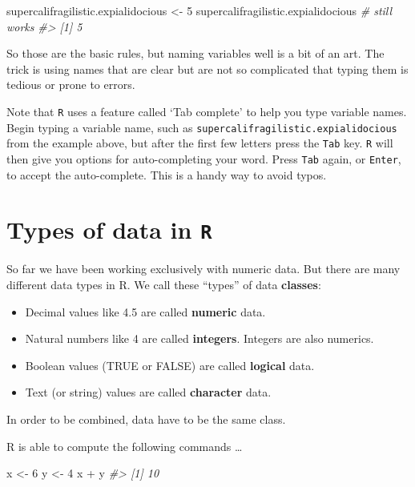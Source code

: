 \documentclass[
]{book}
\newenvironment{Shaded}{\begin{snugshade}}{\end{snugshade}}
\newcommand{\CommentTok}[1]{\textcolor[rgb]{0.56,0.35,0.01}{\textit{#1}}}
\newcommand{\DecValTok}[1]{\textcolor[rgb]{0.00,0.00,0.81}{#1}}
\newcommand{\NormalTok}[1]{#1}
\newcommand{\OtherTok}[1]{\textcolor[rgb]{0.56,0.35,0.01}{#1}}
\newcommand{\SpecialCharTok}[1]{\textcolor[rgb]{0.00,0.00,0.00}{#1}}
\providecommand{\tightlist}{%
  \setlength{\itemsep}{0pt}\setlength{\parskip}{0pt}}
\begin{document}
\begin{Shaded}
\begin{Highlighting}[]
\NormalTok{supercalifragilistic.expialidocious }\OtherTok{\textless{}{-}} \DecValTok{5}
\NormalTok{supercalifragilistic.expialidocious  }\CommentTok{\# still works}
\CommentTok{\#\textgreater{} [1] 5}
\end{Highlighting}
\end{Shaded}

So those are the basic rules, but naming variables well is a bit of an art. The trick is using names that are clear but are not so complicated that typing them is tedious or prone to errors.

Note that \texttt{R} uses a feature called `Tab complete' to help you type variable names. Begin typing a variable name, such as \texttt{supercalifragilistic.expialidocious} from the example above, but after the first few letters press the \texttt{Tab} key. \texttt{R} will then give you options for auto-completing your word. Press \texttt{Tab} again, or \texttt{Enter}, to accept the auto-complete. This is a handy way to avoid typos.

\hypertarget{types-of-data-in-r}{%
\section*{\texorpdfstring{Types of data in \texttt{R}}{Types of data in R}}\label{types-of-data-in-r}}

So far we have been working exclusively with numeric data. But there are many different data types in R. We call these ``types'' of data \textbf{classes}:

\begin{itemize}
\tightlist
\item
  Decimal values like 4.5 are called \textbf{numeric} data.
\item
  Natural numbers like 4 are called \textbf{integers}. Integers are also numerics.
\item
  Boolean values (TRUE or FALSE) are called \textbf{logical} data.
\item
  Text (or string) values are called \textbf{character} data.
\end{itemize}

In order to be combined, data have to be the same class.

R is able to compute the following commands \ldots{}

\begin{Shaded}
\begin{Highlighting}[]
\NormalTok{x }\OtherTok{\textless{}{-}} \DecValTok{6}
\NormalTok{y }\OtherTok{\textless{}{-}} \DecValTok{4}
\NormalTok{x }\SpecialCharTok{+}\NormalTok{ y}
\CommentTok{\#\textgreater{} [1] 10}
\end{Highlighting}
\end{Shaded}
\end{document}
